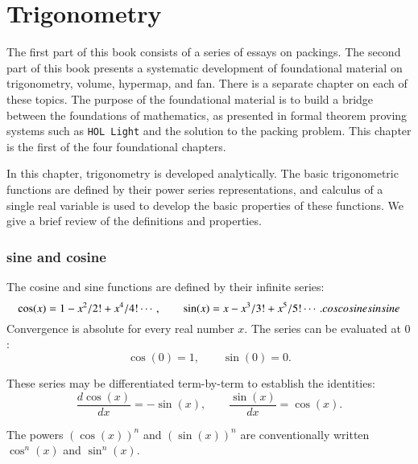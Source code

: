 \chapter{Trigonometry}\label{part:trig}

The first part of this book consists of a series of essays
on packings.  The second part of this book presents
a systematic development of foundational material on
trigonometry, volume, hypermap, and fan.  There is a separate
chapter on each of these topics.  The purpose of the
foundational material is to build a bridge between
the foundations of mathematics, as presented in formal
theorem proving systems such as {\tt HOL Light} and the
solution to the packing problem.  
This chapter is the first of the four foundational chapters.


In this chapter, trigonometry is developed analytically.  The basic
trigonometric functions are defined by their power series
representations, and calculus of a single real variable is used to
develop the basic properties of these functions.  We give a brief
review of the definitions and properties.


\subsection{sine and cosine}

The cosine and sine functions are defined by their infinite series:%
%
    \begin{equation}\label{eqn:cos-def}\cos(x) = 1 - x^2/2! + x^4/4! \cdots,\qquad
  \sin(x) = x - x^3/3! + x^5/5! \cdots.
    \index{Index}{cos}\index{Index}{cosine}\index{Index}{sin}\index{Index}{sine}
    \end{equation}
Convergence is absolute for every real number $x$.
The series can be evaluated at $0$:
    \begin{equation}\label{eqn:cos0}
    \cos(0) = 1,\qquad \sin(0) = 0.
    \end{equation}

These series may be differentiated term-by-term to establish the identities:
    \begin{equation}\label{eqn:cos'}
    \frac{d \cos(x)}{dx} = -\sin(x),\qquad \frac{ \sin(x)}{dx} = \cos(x).
    \end{equation}

The powers $(\cos(x))^n$ and $(\sin(x))^n$ are conventionally written
$\cos^n(x)$ and $\sin^n(x)$.

